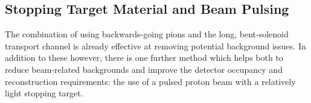 %
%

\subsection{Stopping Target Material and Beam Pulsing}
\label{sec:stop-tgt}
\FigMuonNuclearParams

The combination of using backwards-going pions and the long, bent-solenoid transport channel is already effective at removing potential background issues.
In addition to these however, there is one further method which helps both to reduce beam-related backgrounds and improve the detector occupancy and reconstruction requirements:
the use of a pulsed proton beam with a relatively light stopping target.

